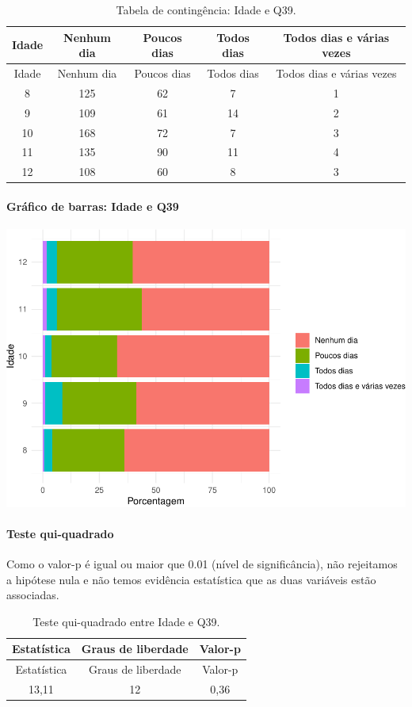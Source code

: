 \documentclass[]{article}
\let\oldparagraph\paragraph
\renewcommand{\paragraph}[1]{\oldparagraph{#1}\mbox{}}
\begin{document}
\begin{longtable}[]{@{}ccccc@{}}
\caption{\label{tab:unnamed-chunk-1507}Tabela de contingência: Idade e Q39.}\tabularnewline
\toprule
Idade & Nenhum dia & Poucos dias & Todos dias & Todos dias e várias vezes\tabularnewline
\midrule
\endfirsthead
\toprule
Idade & Nenhum dia & Poucos dias & Todos dias & Todos dias e várias vezes\tabularnewline
\midrule
\endhead
8 & 125 & 62 & 7 & 1\tabularnewline
9 & 109 & 61 & 14 & 2\tabularnewline
10 & 168 & 72 & 7 & 3\tabularnewline
11 & 135 & 90 & 11 & 4\tabularnewline
12 & 108 & 60 & 8 & 3\tabularnewline
\bottomrule
\end{longtable}

\hypertarget{gruxe1fico-de-barras-idade-e-q39}{%
\paragraph{Gráfico de barras: Idade e Q39}\label{gruxe1fico-de-barras-idade-e-q39}}

\begin{center}\includegraphics[width=0.75\linewidth]{relatorio_covid19_files/figure-latex/unnamed-chunk-1508-1} \end{center}

\hypertarget{teste-qui-quadrado-129}{%
\paragraph{Teste qui-quadrado}\label{teste-qui-quadrado-129}}

Como o valor-p é igual ou maior que 0.01 (nível de significância), não rejeitamos a hipótese nula e não temos evidência estatística que as duas variáveis estão associadas.

\begin{longtable}[]{@{}ccc@{}}
\caption{\label{tab:unnamed-chunk-1510}Teste qui-quadrado entre Idade e Q39.}\tabularnewline
\toprule
Estatística & Graus de liberdade & Valor-p\tabularnewline
\midrule
\endfirsthead
\toprule
Estatística & Graus de liberdade & Valor-p\tabularnewline
\midrule
\endhead
13,11 & 12 & 0,36\tabularnewline
\bottomrule
\end{longtable}
\end{document}
